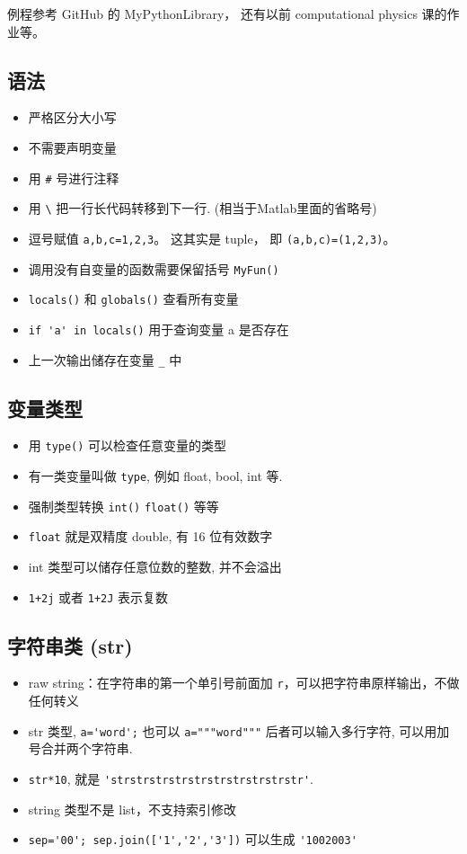 
\begin{issues}
\issueDraft
\end{issues}

例程参考 GitHub 的 MyPythonLibrary， 还有以前 computational physics 课的作业等。

\subsection{语法}
\begin{itemize}
\item 严格区分大小写
\item 不需要声明变量
\item 用 \verb|#| 号进行注释
\item 用 \verb|\| 把一行长代码转移到下一行. (相当于Matlab里面的省略号)
\item 逗号赋值 \verb`a,b,c=1,2,3`。 这其实是 tuple， 即 \verb|(a,b,c)=(1,2,3)|。
\item 调用没有自变量的函数需要保留括号  \verb`MyFun()`
\item \verb`locals()` 和 \verb`globals()` 查看所有变量
\item \verb`if 'a' in locals()` 用于查询变量 a 是否存在
\item 上一次输出储存在变量 \verb`_` 中
\end{itemize}

\subsection{变量类型}
\begin{itemize}
\item 用 \verb`type()` 可以检查任意变量的类型
\item 有一类变量叫做 \verb`type`, 例如 float, bool, int 等.
\item 强制类型转换 \verb`int()` \verb`float()` 等等
\item \verb`float` 就是双精度 double, 有 16 位有效数字
\item int 类型可以储存任意位数的整数, 并不会溢出 
\item \verb`1+2j` 或者 \verb`1+2J` 表示复数
\end{itemize}

\subsection{字符串类 (str)}
\begin{itemize}
\item raw string：在字符串的第一个单引号前面加 \verb|r|，可以把字符串原样输出，不做任何转义
\item str 类型, \verb|a='word';| 也可以 \verb|a="""word"""| 后者可以输入多行字符, 可以用加号合并两个字符串.
\item \verb|str*10|, 就是 \verb|'strstrstrstrstrstrstrstrstrstr'|.
\item string 类型不是 list，不支持索引修改
\item \verb|sep='00'; sep.join(['1','2','3'])| 可以生成 \verb|'1002003'|
\end{itemize}

